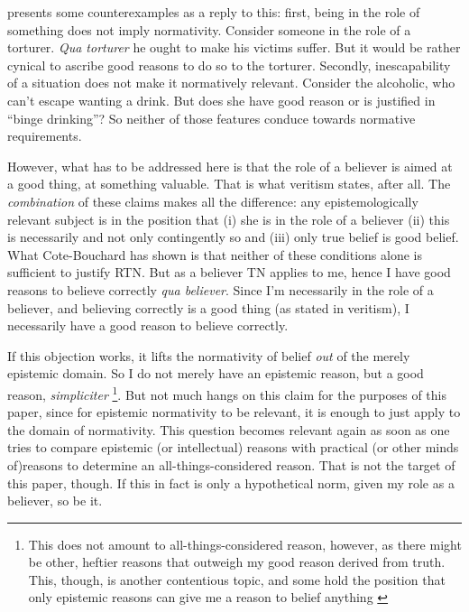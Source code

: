 \documentclass[12pt,numbers=noenddot]{scrartcl}
\begin{document}
\textcite[9]{Cote-BouchardForthcoming-CTBCTA} presents some counterexamples as a reply to this: first, being in the role of something does not imply normativity. Consider someone in the role of a torturer. \emph{Qua torturer} he ought to make his victims suffer. But it would be rather cynical to ascribe good reasons to do so to the torturer. Secondly, inescapability of a situation does not make it normatively relevant. Consider the alcoholic, who can't escape wanting a drink. But does she have good reason or is justified in “binge drinking”? So neither of those features conduce towards normative requirements.

However, what has to be addressed here is that the role of a believer is aimed at a good thing, at something valuable. That is what veritism states, after all. The \emph{combination} of these claims makes all the difference: any epistemologically relevant subject is in the position that (i) she is in the role of a believer (ii) this is necessarily and not only contingently so and (iii) only true belief is good belief. What Cote-Bouchard has shown is that neither of these conditions alone is sufficient to justify RTN. But as a believer TN applies to me, hence I have good reasons to believe correctly \emph{qua believer}. Since I'm necessarily in the role of a believer, and believing correctly is a good thing (as stated in veritism), I necessarily have a good reason to believe correctly.

If this objection works, it lifts the normativity of belief \emph{out} of the merely epistemic domain. So I do not merely have an epistemic reason, but a good reason, \emph{simpliciter}
\footnote{This does not amount to all-things-considered reason, however, as there might be other, heftier reasons that outweigh my good reason derived from truth. This, though, is another contentious topic, and some hold the position that only epistemic reasons can give me a reason to belief anything \autocite{Kelly2003-KELERA}}. But not much hangs on this claim for the purposes of this paper, since for epistemic normativity to be relevant, it is enough to just apply to the domain of normativity. This question becomes relevant again as soon as one tries to compare epistemic (or intellectual) reasons with practical (or other minds of)reasons to determine an all-things-considered reason. That is not the target of this paper, though. If this in fact is only a hypothetical norm, given my role as a believer, so be it.
\end{document}
